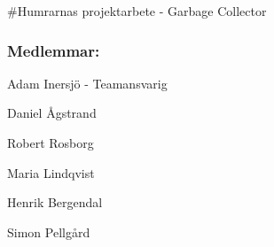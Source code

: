 \#\+Humrarnas projektarbete -\/ Garbage Collector

\subsubsection*{Medlemmar\+:}


\begin{DoxyItemize}
\item Adam Inersjö -\/ Teamansvarig
\item Daniel Ågstrand
\item Robert Rosborg
\item Maria Lindqvist
\item Henrik Bergendal
\item Simon Pellgård 
\end{DoxyItemize}